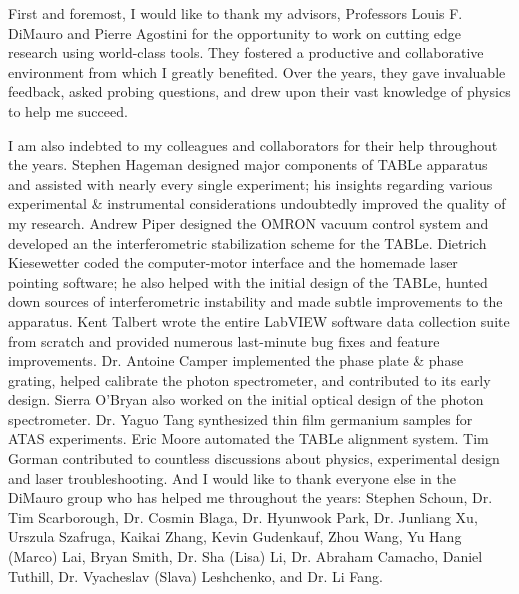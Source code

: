 \begin{acknowledgments}

First and foremost, I would like to thank my advisors, Professors Louis F. DiMauro and Pierre Agostini for the opportunity to work on cutting edge research using world-class tools. They fostered a productive and collaborative environment from which I greatly benefited. Over the years, they gave invaluable feedback, asked probing questions, and drew upon their vast knowledge of physics to help me succeed.

I am also indebted to my colleagues and collaborators for their help throughout the years. Stephen Hageman designed major components of TABLe apparatus and assisted with nearly every single experiment; his insights regarding various experimental \& instrumental considerations undoubtedly improved the quality of my research. Andrew Piper designed the OMRON vacuum control system and developed an the interferometric stabilization scheme for the TABLe. Dietrich Kiesewetter coded the computer-motor interface and the homemade laser pointing software; he also helped with the initial design of the TABLe, hunted down sources of interferometric instability and made subtle improvements to the apparatus. Kent Talbert wrote the entire LabVIEW software data collection suite from scratch and provided numerous last-minute bug fixes and feature improvements. Dr. Antoine Camper implemented the phase plate \& phase grating, helped calibrate the photon spectrometer, and contributed to its early design. Sierra O'Bryan also worked on the initial optical design of the photon spectrometer. Dr. Yaguo Tang synthesized thin film germanium samples for ATAS experiments. Eric Moore automated the TABLe alignment system. Tim Gorman contributed to countless discussions about physics, experimental design and laser troubleshooting. And I would like to thank everyone else in the DiMauro group who has helped me throughout the years: Stephen Schoun, Dr. Tim Scarborough, Dr. Cosmin Blaga, Dr. Hyunwook Park, Dr. Junliang Xu, Urszula Szafruga, Kaikai Zhang, Kevin Gudenkauf, Zhou Wang, Yu Hang (Marco) Lai, Bryan Smith, Dr. Sha (Lisa) Li, Dr. Abraham Camacho, Daniel Tuthill, Dr. Vyacheslav (Slava) Leshchenko, and Dr. Li Fang.


\end{acknowledgments}
